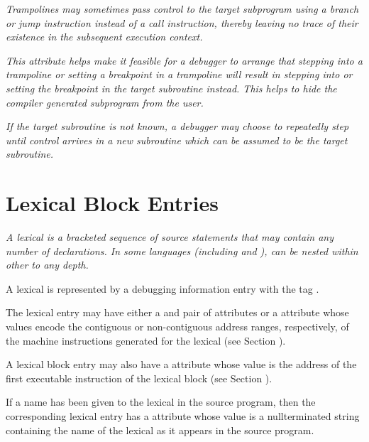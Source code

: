 \textit{Trampolines may sometimes pass control to the target
subprogram using a branch or jump instruction instead of a
call instruction, thereby leaving no trace of their existence
in the subsequent execution context. }

\textit{This attribute helps make it feasible for a debugger to arrange
that stepping into a trampoline or setting a breakpoint in
a trampoline will result in stepping into or setting the
breakpoint in the target subroutine instead. This helps to
hide the compiler generated subprogram from the user. }

\textit{If the target subroutine is not known, a debugger may choose
to repeatedly step until control arrives in a new subroutine
which can be assumed to be the target subroutine. }



\section{Lexical Block Entries}
\label{chap:lexicalblockentries}

\textit{A 
lexical  
is 
a bracketed sequence of source statements
that may contain any number of declarations. In some languages
(including  and ),
 can be nested within other
 to any depth.}

A lexical  is represented by a debugging information
entry with the 
tag \DWTAGlexicalblockTARG.

The lexical  
entry may have 
either a \DWATlowpc{} and
\DWAThighpc{} pair of 
attributes 
or 
a 
\DWATranges{} attribute
whose values encode the contiguous or non-contiguous address
ranges, respectively, of the machine instructions generated
for the lexical  
(see Section ).

A 
\hypertarget{chap:DWATentrypcoflexicalblock}{}
lexical block entry may also have 
a 
\DWATentrypc{} attribute
whose value is the address of the first executable instruction
of the lexical block (see 
Section ).

If a name has been given to the 
lexical  
in the source
program, then the corresponding 
lexical  entry has a
\DWATname{} attribute whose 
value is a null\dash terminated string
containing the name of the lexical  
as it appears in
the source program.

